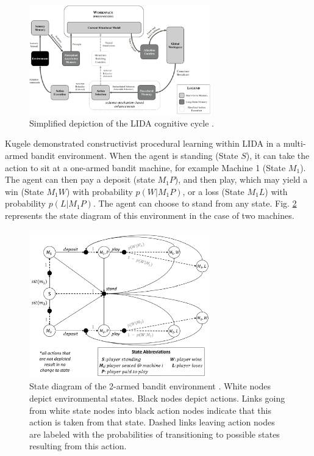 \documentclass[runningheads]{llncs}
\begin{document}
\begin{figure}
	\centering
	\includegraphics[width=0.7\textwidth]{Figure_LIDA.png}
	\caption{Simplified depiction of the LIDA cognitive cycle \cite[Fig. 4]{kugele2025_constructivist}.
	} 
	\label{fig:lida}
\end{figure}

Kugele \cite{kugele2025_constructivist} demonstrated constructivist procedural learning within LIDA in a multi-armed bandit environment.
When the agent is standing (State $S$), it can take the action to sit at a one-armed bandit machine, for example Machine 1 (State $M_1$).
The agent can then pay a deposit (state $M_1P$), and then play, which may yield a win (State $M_1W$) with probability $p(W|M_1P)$, or a loss (State $M_1L$) with probability $p(L|M_1P)$. The agent can choose to stand from any state.
Fig. \ref{fig:lida_bench} represents the state diagram of this environment in the case of two machines. 

\begin{figure}
	\centering
	\includegraphics[width=0.7\textwidth]{Figure_LIDA_bench.png}
	\caption{State diagram of the 2-armed bandit environment \cite[Fig. 5]{kugele2025_constructivist}.
	White nodes depict environmental states.
	Black nodes depict actions. 
	Links going from white state nodes into black action nodes indicate that this action is taken from that state. 
	Dashed links leaving action nodes are labeled with the probabilities of transitioning to possible states resulting from this action.} 
	\label{fig:lida_bench}
\end{figure}
\end{document}
